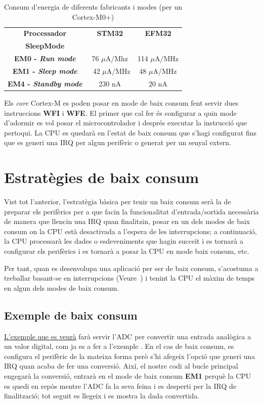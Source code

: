 \begin{table}
\caption{Consum d'energia de diferents fabricants i modes (per un Cortex-M0+) \cite{EFM32ZG108DS}\cite{STM32L01}}
\centering
\begin{tabular}{|c|c|c|}
\hline
{\bf Processador} & {\bf STM32} & {\bf EFM32}\\
{\bf SleepMode} & & \\
\hline
{\bf EM0 - {\em Run mode}} &  76 $\mu$A/Mhz &  114 $\mu$A/MHz\\
\hline
{\bf EM1 - {\em Sleep mode}} & ~42  $\mu$A/MHz & 48 $\mu$A/MHz\\
\hline
{\bf EM4 - {\em Standby mode}} & 230 nA & 20 nA \\
\hline
\end{tabular}
\label{tb:bin_size}
\end{table}

Els {\em core} Cortex-M es poden posar en mode de baix consum fent servir dues instruccions {\bf WFI} i {\bf WFE}. El primer que cal fer és configurar a quin mode d'adormir es vol posar el microcontrolador i després executar la instrucció que pertoqui. La CPU es quedarà en l'estat de baix consum que s'hagi configurat fins que es generi una \gls{IRQ} per algun perifèric o generat per un senyal extern.

\section{Estratègies de baix consum}
\label{sec:lowpowerstrategies}
Vist tot l'anterior, l'estratègia bàsica per tenir un baix consum serà la de preparar els perifèrics per a que facin la funcionalitat d'entrada/sortida necessària de manera que llencin una \gls{IRQ} quan finalitzin, posar en un dels modes de baix consum on la CPU està desactivada a l'espera de les interrupcions; a continuació, la CPU processarà les dades o esdeveniments que hagin succeït i es tornarà a configurar els perifèrics i es tornarà a posar la CPU en mode baix consum, etc.

Per tant, quan es desenvolupa una aplicació per ser de baix consum, s'acostuma a treballar basant-se en interrupcions (Veure~) i tenint la CPU el màxim de temps en algun dels modes de baix consum.

\subsection{Exemple de baix consum}
\href{https://github.com/mariusmm/cursembedded/tree/master/Simplicity/ADC_1_LP}{L'exemple que es veurà} farà servir l'\gls{ADC} per convertir una entrada analògica a un valor digital, com ja es a fer a l'exemple . En el cas de baix consum, es configura el perifèric de la mateixa forma però s'hi afegeix l'opció que generi una \gls{IRQ} quan acaba de fer una conversió. Així, el nostre codi al bucle principal engegarà la conversió, entrarà en el mode de baix consum {\bf EM1} perquè la CPU es quedi en repòs mentre l'ADC fa la seva feina i es desperti per la \gls{IRQ} de finalització; tot seguit es llegeix i es mostra la dada convertida.

